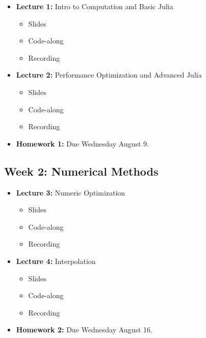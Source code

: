 \documentclass[
]{book}
\providecommand{\tightlist}{%
  \setlength{\itemsep}{0pt}\setlength{\parskip}{0pt}}
\begin{document}
\begin{itemize}
\tightlist
\item
  \textbf{Lecture 1:} Intro to Computation and Basic Julia

  \begin{itemize}
  \tightlist
  \item
    Slides
  \item
    Code-along
  \item
    Recording
  \end{itemize}
\item
  \textbf{Lecture 2:} Performance Optimization and Advanced Julia

  \begin{itemize}
  \tightlist
  \item
    Slides
  \item
    Code-along
  \item
    Recording
  \end{itemize}
\item
  \textbf{Homework 1:} Due Wednesday August 9.
\end{itemize}

\hypertarget{week-2-numerical-methods}{%
\subsection{Week 2: Numerical Methods}\label{week-2-numerical-methods}}

\begin{itemize}
\tightlist
\item
  \textbf{Lecture 3:} Numeric Optimization

  \begin{itemize}
  \tightlist
  \item
    Slides
  \item
    Code-along
  \item
    Recording
  \end{itemize}
\item
  \textbf{Lecture 4:} Interpolation

  \begin{itemize}
  \tightlist
  \item
    Slides
  \item
    Code-along
  \item
    Recording
  \end{itemize}
\item
  \textbf{Homework 2:} Due Wednesday August 16.
\end{itemize}
\end{document}
